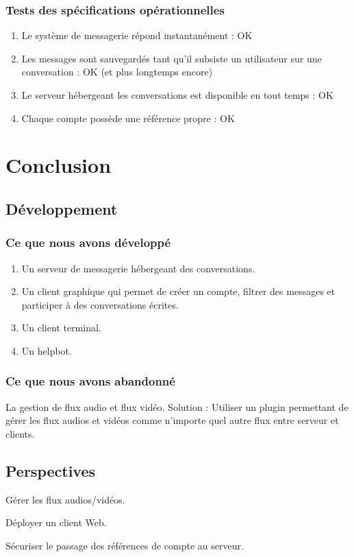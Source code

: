 \documentclass[11pt,dvipsnames,svgnames]{report}
\begin{document}
\subsection{Tests des spécifications opérationnelles}
\begin{enumerate}
\item Le système de messagerie répond instantanément : OK
\item Les messages sont sauvegardés tant qu'il subsiste un utilisateur sur une conversation : OK (et plus longtemps encore)
\item Le serveur hébergeant les conversations est disponible en tout temps : OK
\item Chaque compte possède une référence propre : OK
\end{enumerate}

\chapter{Conclusion}
\section{Développement}
\subsection{Ce que nous avons développé}
\begin{enumerate}
\item Un serveur de messagerie hébergeant des conversations.
\item Un client graphique qui permet de créer un compte, filtrer des messages et participer à des conversations écrites.
\item Un client terminal.
\item Un helpbot.
\end{enumerate}
\subsection{Ce que nous avons abandonné}
La gestion de flux audio et flux vidéo.
Solution : Utiliser un plugin permettant de gérer les flux audios et vidéos comme n'importe quel autre flux entre serveur et clients.
\section{Perspectives}
Gérer les flux audios/vidéos.

Déployer un client Web.

Sécuriser le passage des références de compte au serveur.
\end{document}
